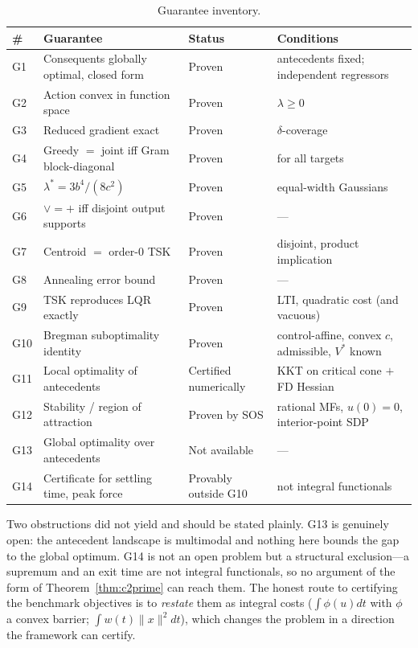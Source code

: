 \documentclass[11pt]{article}
\theoremstyle{plain}
\theoremstyle{definition}
\begin{document}
\begin{table}[t]
\centering
\caption{Guarantee inventory.}
\label{tab:inventory}
\footnotesize
\begin{tabular}{@{}ll>{\raggedright\arraybackslash}p{3.1cm}>{\raggedright\arraybackslash}p{5.2cm}@{}}
\toprule
\# & Guarantee & Status & Conditions \\
\midrule
G1 & Consequents globally optimal, closed form & Proven & antecedents fixed; independent regressors \\
G2 & Action convex in function space & Proven & $\lambda\ge0$ \\
G3 & Reduced gradient exact & Proven & $\delta$-coverage \\
G4 & Greedy $=$ joint iff Gram block-diagonal & Proven & for all targets \\
G5 & $\lambda^{*}=3b^{4}/(8c^{2})$ & Proven & 2 equal-width Gaussians \\
G6 & $\vee=+$ iff disjoint output supports & Proven & --- \\
G7 & Centroid $=$ order-$0$ TSK & Proven & disjoint, product implication \\
G8 & Annealing error bound & Proven & --- \\
G9 & TSK reproduces LQR exactly & Proven & LTI, quadratic cost (and vacuous) \\
G10 & Bregman suboptimality identity & Proven & control-affine, convex $c$, admissible, $V^{*}$ known \\
G11 & Local optimality of antecedents & Certified numerically & KKT on critical cone $+$ FD Hessian \\
G12 & Stability / region of attraction & Proven by SOS & rational MFs, $u(0)=0$, interior-point SDP \\
G13 & Global optimality over antecedents & Not available & --- \\
G14 & Certificate for settling time, peak force & Provably outside G10 & not integral functionals \\
\bottomrule
\end{tabular}
\end{table}

Two obstructions did not yield and should be stated plainly. G13 is genuinely
open: the antecedent landscape is multimodal and nothing here bounds the gap to
the global optimum. G14 is not an open problem but a structural exclusion---a
supremum and an exit time are not integral functionals, so no argument of the
form of Theorem~\ref{thm:c2prime} can reach them. The honest route to certifying
the benchmark objectives is to \emph{restate} them as integral costs
($\int\phi(u)dt$ with $\phi$ a convex barrier; $\int w(t)\|x\|^{2}dt$), which
changes the problem in a direction the framework can certify.
\end{document}
